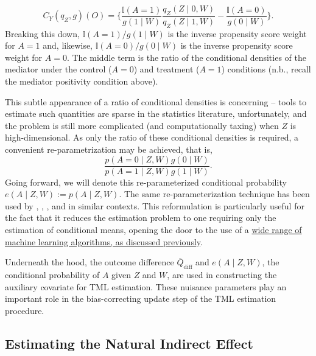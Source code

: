 \documentclass[
  12pt, krantz2,
]{krantz}
\newcommand{\1}{\mathbbm{1}}
\theoremstyle{definition}
\theoremstyle{definition}
\theoremstyle{definition}
\theoremstyle{definition}
\theoremstyle{remark}
\begin{document}
\begin{equation*}
  C_Y(q_Z, g)(O) = \Bigg\{\frac{\mathbb{I}(A = 1)}{g(1 \mid W)}
  \frac{q_Z(Z \mid 0, W)}{q_Z(Z \mid 1, W)} -
  \frac{\mathbb{I}(A = 0)}{g(0 \mid W)} \Bigg\}.
\end{equation*}
Breaking this down, \(\mathbb{I}(A = 1) / g(1 \mid W)\) is the inverse propensity
score weight for \(A = 1\) and, likewise, \(\mathbb{I}(A = 0) / g(0 \mid W)\) is the
inverse propensity score weight for \(A = 0\). The middle term is the ratio of the
conditional densities of the mediator under the control (\(A = 0\)) and treatment
(\(A = 1\)) conditions (n.b., recall the mediator positivity condition above).

This subtle appearance of a ratio of conditional densities is concerning --
tools to estimate such quantities are sparse in the statistics literature,
unfortunately, and the problem is still more complicated (and computationally
taxing) when \(Z\) is high-dimensional. As only the ratio of these conditional
densities is required, a convenient re-parametrization may be achieved, that is,
\begin{equation*}
  \frac{p(A = 0 \mid Z, W) g(0 \mid W)}{p(A = 1 \mid Z, W) g(1 \mid W)}.
\end{equation*}
Going forward, we will denote this re-parameterized conditional probability
\(e(A \mid Z, W) := p(A \mid Z, W)\). The same re-parameterization technique has
been used by \citet{zheng2012targeted}, \citet{tchetgen2013inverse}, \citet{diaz2020causal}, and
\citet{diaz2020nonparametric} in similar contexts. This reformulation is particularly
useful for the fact that it reduces the estimation problem to one requiring
only the estimation of conditional means, opening the door to the use of a
\protect\hyperlink{sl3}{wide range of machine learning algorithms, as discussed previously}.

Underneath the hood, the outcome difference \(\overline{Q}_{\text{diff}}\) and
\(e(A \mid Z, W)\), the conditional probability of \(A\) given \(Z\) and \(W\), are used
in constructing the auxiliary covariate for TML estimation. These nuisance
parameters play an important role in the bias-correcting update step of the TML
estimation procedure.

\hypertarget{estimating-the-natural-indirect-effect}{%
\subsection{Estimating the Natural Indirect Effect}\label{estimating-the-natural-indirect-effect}}
\end{document}
